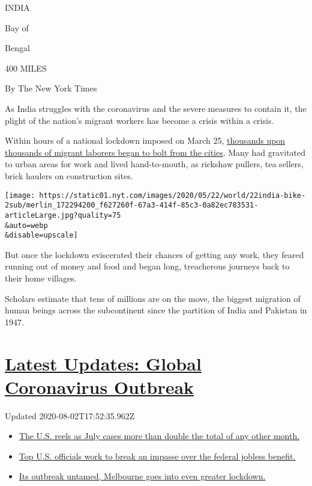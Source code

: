 INDIA

Bay of

Bengal

400 MILES

By The New York Times

As India struggles with the coronavirus and the severe measures to
contain it, the plight of the nation's migrant workers has become a
crisis within a crisis.

Within hours of a national lockdown imposed on March 25,
\href{https://www.nytimes.com/2020/03/29/world/asia/coronavirus-india-migrants.html}{thousands
upon thousands of migrant laborers began to bolt from the cities}. Many
had gravitated to urban areas for work and lived hand-to-mouth, as
rickshaw pullers, tea sellers, brick haulers on construction sites.

\texttt{[image: https://static01.nyt.com/images/2020/05/22/world/22india-bike-2sub/merlin\_172294200\_f627260f-67a3-414f-85c3-0a82ec783531-articleLarge.jpg?quality=75\\\&auto=webp\\\&disable=upscale]}

But once the lockdown eviscerated their chances of getting any work,
they feared running out of money and food and began long, treacherous
journeys back to their home villages.

Scholars estimate that tens of millions are on the move, the biggest
migration of human beings across the subcontinent since the partition of
India and Pakistan in 1947.

\hypertarget{latest-updates-global-coronavirus-outbreak}{%
\section{\texorpdfstring{\href{https://www.nytimes.com/2020/08/01/world/coronavirus-covid-19.html?action=click\&pgtype=Article\&state=default\&region=MAIN_CONTENT_1\&context=storylines_live_updates}{Latest
Updates: Global Coronavirus
Outbreak}}{Latest Updates: Global Coronavirus Outbreak}}\label{latest-updates-global-coronavirus-outbreak}}

Updated 2020-08-02T17:52:35.962Z

\begin{itemize}
\tightlist
\item
  \href{https://www.nytimes.com/2020/08/01/world/coronavirus-covid-19.html?action=click\&pgtype=Article\&state=default\&region=MAIN_CONTENT_1\&context=storylines_live_updates\#link-34047410}{The
  U.S. reels as July cases more than double the total of any other
  month.}
\item
  \href{https://www.nytimes.com/2020/08/01/world/coronavirus-covid-19.html?action=click\&pgtype=Article\&state=default\&region=MAIN_CONTENT_1\&context=storylines_live_updates\#link-780ec966}{Top
  U.S. officials work to break an impasse over the federal jobless
  benefit.}
\item
  \href{https://www.nytimes.com/2020/08/01/world/coronavirus-covid-19.html?action=click\&pgtype=Article\&state=default\&region=MAIN_CONTENT_1\&context=storylines_live_updates\#link-2bc8948}{Its
  outbreak untamed, Melbourne goes into even greater lockdown.}
\end{itemize}


